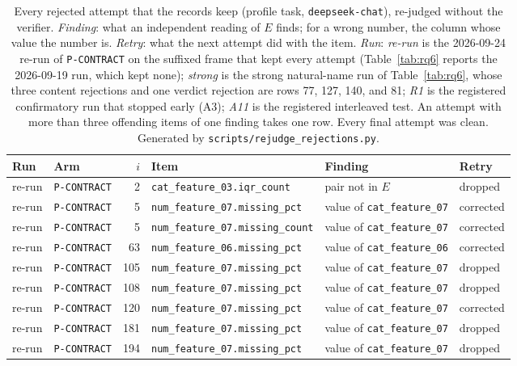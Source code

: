 \documentclass[journal]{IEEEtran}
\begin{document}
\begin{table}[!tp]
\caption{Every rejected attempt that the records keep (profile task,
\texttt{deepseek-chat}), re-judged without the verifier. \emph{Finding}: what
an independent reading of $E$ finds; for a wrong number, the column whose
value the number is. \emph{Retry}: what the next attempt did with the item.
\emph{Run}: \emph{re-run} is the 2026-09-24 re-run of \texttt{P-CONTRACT}
on the suffixed frame that kept every attempt (Table~\ref{tab:rq6} reports the
2026-09-19 run, which kept none); \emph{strong} is the strong natural-name run
of Table~\ref{tab:rq6}, whose three content rejections and one verdict
rejection are rows 77, 127, 140, and 81; \emph{R1} is the registered
confirmatory run that stopped early (A3); \emph{A11} is the registered
interleaved test. An attempt
with more than three offending items of one finding takes one row. Every final
attempt was clean. Generated by \texttt{scripts/rejudge\_rejections.py}.}
\label{tab:rejections}
\centering
\footnotesize
\setlength{\tabcolsep}{2.5pt}
\begin{tabular}{@{}llrlll@{}}
\toprule
Run & Arm & $i$ & Item & Finding & Retry \\
\midrule
re-run & \texttt{P-CONTRACT} & 2 & \texttt{cat\_feature\_03.iqr\_count} & pair not in $E$ & dropped \\
re-run & \texttt{P-CONTRACT} & 5 & \texttt{num\_feature\_07.missing\_pct} & value of \texttt{cat\_feature\_07} & corrected \\
re-run & \texttt{P-CONTRACT} & 5 & \texttt{num\_feature\_07.missing\_count} & value of \texttt{cat\_feature\_07} & corrected \\
re-run & \texttt{P-CONTRACT} & 63 & \texttt{num\_feature\_06.missing\_pct} & value of \texttt{cat\_feature\_06} & corrected \\
re-run & \texttt{P-CONTRACT} & 105 & \texttt{num\_feature\_07.missing\_pct} & value of \texttt{cat\_feature\_07} & dropped \\
re-run & \texttt{P-CONTRACT} & 108 & \texttt{num\_feature\_07.missing\_pct} & value of \texttt{cat\_feature\_07} & dropped \\
re-run & \texttt{P-CONTRACT} & 120 & \texttt{num\_feature\_07.missing\_pct} & value of \texttt{cat\_feature\_07} & corrected \\
re-run & \texttt{P-CONTRACT} & 181 & \texttt{num\_feature\_07.missing\_pct} & value of \texttt{cat\_feature\_07} & dropped \\
re-run & \texttt{P-CONTRACT} & 194 & \texttt{num\_feature\_07.missing\_pct} & value of \texttt{cat\_feature\_07} & dropped \\

\end{tabular}
\end{table}
\end{document}
